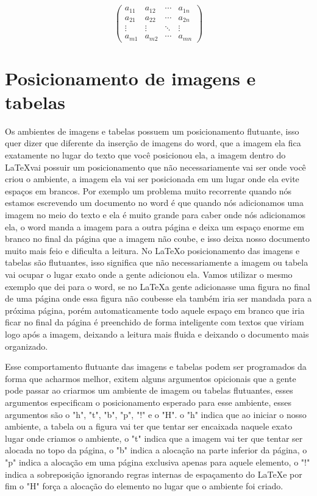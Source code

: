 \[\begin{pmatrix}
    a_{11} & a_{12} & \cdots & a_{1n}\\
    a_{21} & a_{22} & \cdots & a_{2n}\\
    \vdots & \vdots & \ddots & \vdots\\
    a_{m1} & a_{m2} & \cdots & a_{mn}
\end{pmatrix}\]

\section{Posicionamento de imagens e tabelas}
Os ambientes de imagens e tabelas possuem um posicionamento flutuante, isso quer dizer que diferente da inserção de imagens do word, que a imagem ela fica exatamente no lugar do texto que você posicionou ela, a imagem dentro do \LaTeX vai possuir um posicionamento que não necessariamente vai ser onde você criou o ambiente, a imagem ela vai ser posicionada em um lugar onde ela evite espaços em brancos. Por exemplo um problema muito recorrente quando nós estamos escrevendo um documento no word é que quando nós adicionamos uma imagem no meio do texto e ela é muito grande para caber onde nós adicionamos ela, o word manda a imagem para a outra página e deixa um espaço enorme em branco no final da página que a imagem não coube, e isso deixa nosso documento muito mais feio e dificulta a leitura. No \LaTeX o posicionamento das imagens e tabelas são flutuantes, isso significa que não necessariamente a imagem ou tabela vai ocupar o lugar exato onde a gente adicionou ela. Vamos utilizar o mesmo exemplo que dei para o word, se no \LaTeX a gente adicionasse uma figura no final de uma página onde essa figura não coubesse ela também iria ser mandada para a próxima página, porém automaticamente todo aquele espaço em branco que iria ficar no final da página é preenchido de forma inteligente com textos que viriam logo após a imagem, deixando a leitura mais fluida e deixando o documento mais organizado.

Esse comportamento flutuante das imagens e tabelas podem ser programados da forma que acharmos melhor, exitem alguns argumentos opicionais que a gente pode passar ao criarmos um ambiente de imagem ou tabelas flutuantes, esses argumentos especificam o posicionamento esperado para esse ambiente, esses argumentos são o "h", "t", "b", "p", "!" e o "H". o "h" indica que ao iniciar o nosso ambiente, a tabela ou a figura vai ter que tentar ser encaixada naquele exato lugar onde criamos o ambiente, o "t" indica que a imagem vai ter que tentar ser alocada no topo da página, o "b" indica a alocação na parte inferior da página, o "p" indica a alocação em uma página exclusiva apenas para aquele elemento, o "!" indica a sobreposição ignorando regras internas de espaçamento do \LaTeX e por fim o "H" força a alocação do elemento no lugar que o ambiente foi criado.

